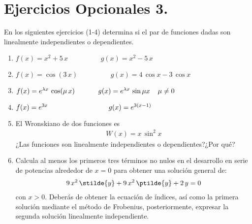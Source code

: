 \section{Ejercicios Opcionales 3.}
En los siguientes ejercicios (1-4) determina si el par de funciones dadas son linealmente independientes o dependientes.
\begin{enumerate}
\item $f(x) = x^{2} + 5 \, x \hspace{2cm} g(x) = x^{2} - 5 \, x$ 
\item $f(x) = \cos (3 \, x) \hspace{2cm} g(x) = 4 \, \cos x - 3 \, \cos x$
\item $f(x) = e^{\lambda x} \, \cos (\mu \, x) \hspace{1.2cm} g(x) = e^{\lambda x} \, \sin \mu x \hspace{0.4cm} \mu \neq 0 $
\item $f(x) = e^{3 x} \hspace{3.1cm} g(x) = e^{3(x-1)}$
\item El Wronskiano de dos funciones es
\begin{align*}
W(x) = x \, \sin^{2} x
\end{align*}
¿Las funciones son linealmente independientes o dependientes?¿Por qué?
\item Calcula al menos los primeros tres términos no nulos en el desarrollo en serie de potencias alrededor de $x=0$ para obtener una solución general de:
\begin{align*}
9 \, x^{2} \, \stilde{y} + 9 \, x^{2} \, \ptilde{y} + 2 \, y = 0
\end{align*}
con $x > 0$. Deberás de obtener la ecuación de índices, así como la primera solución mediante el método de Frobenius, posteriormente, expresar la segunda solución linealmente independiente.
\end{enumerate}
